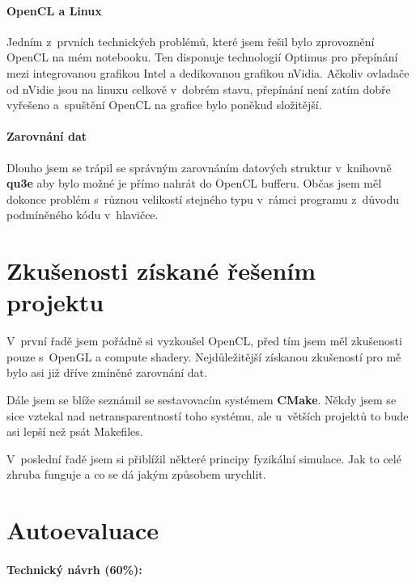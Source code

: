\documentclass[11pt,a4paper]{article}
\begin{document}
\paragraph{OpenCL a Linux}

Jedním z~prvních technických problémů, které jsem řešil bylo zprovoznění OpenCL
na mém notebooku. Ten disponuje technologií Optimus pro přepínání mezi
integrovanou grafikou Intel a dedikovanou grafikou nVidia.
Ačkoliv ovladače od nVidie jsou na linuxu celkově v~dobrém stavu, přepínání
není zatím dobře vyřešeno a~spuštění OpenCL na grafice bylo poněkud složitější.

\paragraph{Zarovnání dat}

Dlouho jsem se trápil se správným zarovnáním datových struktur v~knihovně
\textbf{qu3e} aby bylo možné je přímo nahrát do OpenCL bufferu.
Občas jsem měl dokonce problém s~různou velikostí stejného typu v~rámci programu
z~důvodu podmíněného kódu v~hlavičce.

\section{Zkušenosti získané řešením projektu}

V~první řadě jsem pořádně si vyzkoušel OpenCL, před tím jsem měl zkušenosti pouze
s~OpenGL a compute shadery. Nejdůležitější získanou zkušeností pro mě
bylo asi již dříve zmíněné zarovnání dat.

Dále jsem se blíže seznámil se sestavovacím systémem \textbf{CMake}.
Někdy jsem se sice vztekal nad netransparentností toho systému, ale
u~větších projektů to bude asi lepší než psát Makefiles.

V~poslední řadě jsem si přiblížil některé principy fyzikální simulace.
Jak to celé zhruba funguje a co se dá jakým způsobem urychlit.

\section{Autoevaluace}

\paragraph{Technický návrh (60\%):}
\end{document}
